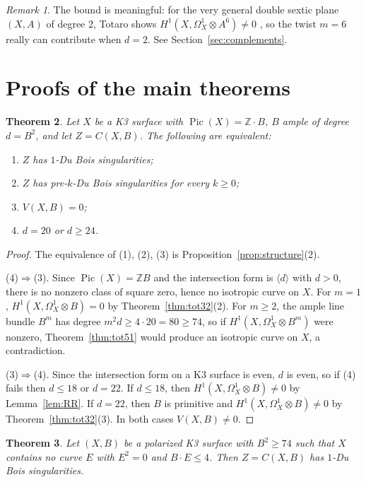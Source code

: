 \documentclass[11pt]{amsart}
\numberwithin{equation}{section}
\theoremstyle{plain}
\newtheorem{theorem}{Theorem}[section]
\theoremstyle{definition}
\theoremstyle{remark}
\newtheorem{remark}[theorem]{Remark}
\newcommand{\ZZ}{\mathbb{Z}}
\newcommand{\Pic}{\operatorname{Pic}}
\begin{document}
\begin{remark}
The bound is meaningful: for the very general double sextic plane $(X,A)$ of degree $2$, Totaro shows $H^1(X,\Omega^1_X\otimes A^6)\ne0$ \cite[Ex.~5.2]{Tot}, so the twist $m=6$ really can contribute when $d=2$. See Section~\ref{sec:complements}.
\end{remark}

\section{Proofs of the main theorems}\label{sec:main}

\begin{theorem}\label{thm:A}
Let $X$ be a K3 surface with $\Pic(X)=\ZZ\cdot B$, $B$ ample of degree $d=B^2$, and let $Z=C(X,B)$.
The following are equivalent:
\begin{enumerate}
\item $Z$ has $1$-Du Bois singularities;
\item $Z$ has pre-$k$-Du Bois singularities for every $k\ge0$;
\item $V(X,B)=0$;
\item $d=20$ or $d\ge24$.
\end{enumerate}
\end{theorem}

\begin{proof}
The equivalence of (1), (2), (3) is Proposition~\ref{prop:structure}(2).

(4)$\Rightarrow$(3).
Since $\Pic(X)=\ZZ B$ and the intersection form is $\langle d\rangle$ with $d>0$, there is no nonzero class of square zero, hence no isotropic curve on $X$.
For $m=1$, $H^1(X,\Omega^1_X\otimes B)=0$ by Theorem~\ref{thm:tot32}(2).
For $m\ge2$, the ample line bundle $B^m$ has degree $m^2d\ge4\cdot20=80\ge74$, so if $H^1(X,\Omega^1_X\otimes B^m)$ were nonzero, Theorem~\ref{thm:tot51} would produce an isotropic curve on $X$, a contradiction.

(3)$\Rightarrow$(4).
Since the intersection form on a K3 surface is even, $d$ is even, so if (4) fails then $d\le18$ or $d=22$.
If $d\le18$, then $H^1(X,\Omega^1_X\otimes B)\ne0$ by Lemma~\ref{lem:RR}.
If $d=22$, then $B$ is primitive and $H^1(X,\Omega^1_X\otimes B)\ne0$ by Theorem~\ref{thm:tot32}(3).
In both cases $V(X,B)\ne0$.
\end{proof}

\begin{theorem}\label{thm:B}
Let $(X,B)$ be a polarized K3 surface with $B^2\ge74$ such that $X$ contains no curve $E$ with $E^2=0$ and $B\cdot E\le4$.
Then $Z=C(X,B)$ has $1$-Du Bois singularities.
\end{theorem}
\end{document}
